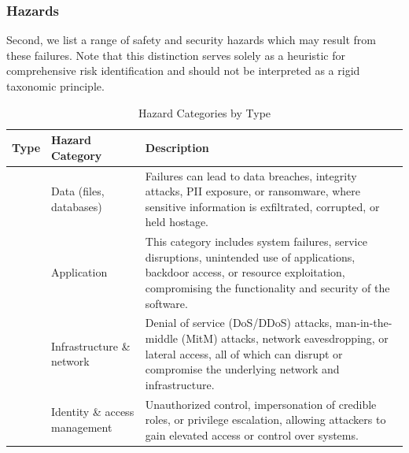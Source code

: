 \documentclass{article}
\begin{document}
\subsubsection{Hazards}

Second, we list a range of safety and security hazards which may result from these failures. Note that this distinction serves solely as a heuristic for comprehensive risk identification and should not be interpreted as a rigid taxonomic principle.

\begin{table}[h]
\centering
\caption{Hazard Categories by Type}
\setlength{\tabcolsep}{6pt}
\renewcommand{\arraystretch}{1.2}


\begin{tabularx}{\linewidth}{
  >{\centering\arraybackslash}m{2cm}   %
  >{\raggedright\arraybackslash}p{3cm} %
  >{\raggedright\arraybackslash}X        %
}
\toprule
\textbf{Type} & \textbf{Hazard Category} & \textbf{Description} \\
\midrule

\cellcolor{white} & Data (files, databases) &
Failures can lead to data breaches, integrity attacks, PII exposure, or ransomware, where sensitive information is exfiltrated, corrupted, or held hostage. \\

\cellcolor{white} & Application &
This category includes system failures, service disruptions, unintended use of applications, backdoor access, or resource exploitation, compromising the functionality and security of the software. \\

\cellcolor{white}{\multirow{-4}{*}{\textbf{Security}}} & Infrastructure \& network &
Denial of service (DoS/DDoS) attacks, man-in-the-middle (MitM) attacks, network eavesdropping, or lateral access, all of which can disrupt or compromise the underlying network and infrastructure. \\

\cellcolor{white} & Identity \& access management &
Unauthorized control, impersonation of credible roles, or privilege escalation, allowing attackers to gain elevated access or control over systems. \\


\end{tabularx}
\end{table}
\end{document}
